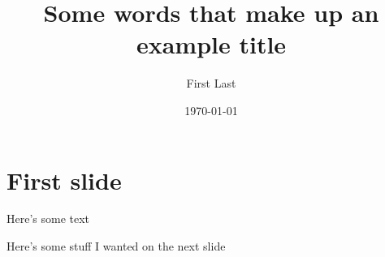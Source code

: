 \documentclass[paper = 9.6cm:12.8cm, paper = landscape, fontsize = 8pt, pagesize, parskip = half, DIV = calc]{scrartcl}
\title{Some words that make up an example title}
\author{First Last}
\date{\today}
\begin{document}
\maketitle
\thispagestyle{empty}
\clearpage

\small\tableofcontents

\clearpage

\section{First slide}

Here's some text

\clearpage

Here's some stuff I wanted on the next slide
\end{document}
